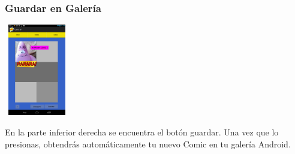 \documentclass[utf8]{beamer}
\begin{document}
\begin{frame}
  \frametitle{Guardar en Galería}
 

  	\begin{center}
		\begingroup
			\includegraphics[height=4cm,width=2.8205cm]{imagenes/drag.png}
		\endgroup
	\end{center}

  \begin{block}{}
En la parte inferior derecha se encuentra el botón guardar. Una vez que lo presionas, obtendrás automáticamente tu nuevo Comic en tu galería Android.
  \end{block}

\end{frame}
\end{document}
